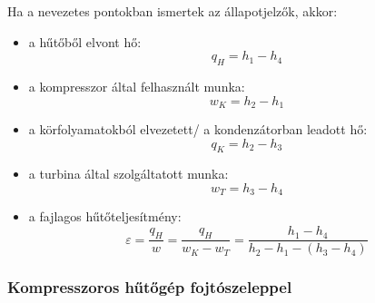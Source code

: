 Ha a nevezetes pontokban ismertek az állapotjelzők, akkor:
\begin{itemize}
	\item a hűtőből elvont hő:\begin{equation*}
	q_H=h_1-h_4
	\end{equation*}
	\item a kompresszor által felhasznált munka:\begin{equation*}
	w_K=h_2-h_1
	\end{equation*}
	\item a körfolyamatokból elvezetett/ a kondenzátorban leadott hő:\begin{equation*}
	q_K=h_2-h_3
	\end{equation*}
	\item a turbina által szolgáltatott munka:\begin{equation*}
	w_T=h_3-h_4
	\end{equation*}
	\item a fajlagos hűtőteljesítmény:\begin{equation*}
	\varepsilon= \dfrac{q_{H}}{w}=\dfrac{q_H}{w_K-w_T}=\dfrac{h_1-h_4}{h_2-h_1-(h_3-h_4)}
	\end{equation*}
	\end{itemize}

\subsubsection{Kompresszoros hűtőgép fojtószeleppel}

